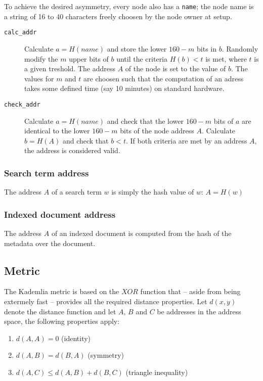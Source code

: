 \documentclass[a4paper,8pt,twocolumn]{scrartcl}
\begin{document}
To achieve the desired asymmetry, every node also has a {\tt name}; the node name is a string of 16 to 40 characters freely choosen by the node owner at setup.

\begin{description}
 \item [{\tt calc\_addr}] Calculate $a = H(name)$ and store the lower $160-m$ bits in $b$. Randomly modify the $m$ upper bits of $b$ until the criteria $H(b) < t$ is met, where $t$ is a given treshold. The address $A$ of the node is set to the value of $b$. The values for $m$ and $t$ are choosen such that the computation of an adress takes some defined time (say 10 minutes) on standard hardware.
 \item [{\tt check\_addr}] Calculate $a = H(name)$ and check that the lower $160 - m$ bits of $a$ are identical to the lower $160 - m$ bits of the node address $A$. Calculate $b = H(A)$ and check that $b < t$. If both criteria are met by an address $A$, the address is considered valid.
\end{description}

\subsubsection{Search term address}\label{search_term_addr}

The address $A$ of a search term $w$ is simply the hash value of $w$: $A = H(w)$

\subsubsection{Indexed document address}\label{indexed_document_addr}

The address $A$ of an indexed document is computed from the hash of the metadata over the document.

\subsection{Metric}

The Kademlia metric is based on the $XOR$ function that -- aside from being extermely fast -- provides all the required distance properties. Let $d(x,y)$ denote the distance function and let $A$, $B$ and $C$ be addresses in the address space, the following properties apply:

\begin{enumerate}
  \item $d(A,A) = 0$ (identity)
  \item $d(A,B) = d(B,A)$ (symmetry)
  \item $d(A,C) \leq d(A,B) + d(B,C)$ (triangle inequality)
\end{enumerate}
\end{document}
